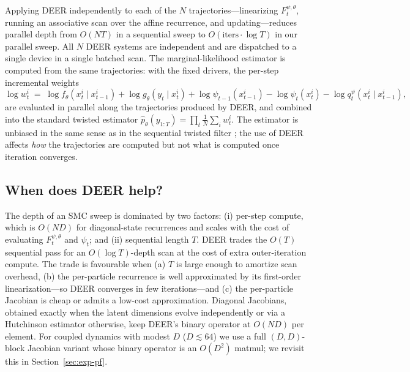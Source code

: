 \documentclass{article}
\begin{document}
Applying DEER independently to each of the $N$ trajectories---linearizing $F_t^{\psi,\theta}$, running an associative scan over the affine recurrence, and updating---reduces parallel depth from $O(NT)$ in a sequential sweep to $O(\text{iters} \cdot \log T)$ in our parallel sweep. All $N$ DEER systems are independent and are dispatched to a single device in a single batched scan. The marginal-likelihood estimator is computed from the same trajectories: with the fixed drivers, the per-step incremental weights
\begin{equation}
    \log w_t^{i} \;=\; \log f_\theta(x_t^{i} \mid x_{t-1}^{i}) + \log g_\theta(y_t \mid x_t^{i}) + \log \psi_{t-1}(x_{t-1}^{i}) - \log \psi_t(x_t^{i}) - \log q_t^\psi(x_t^{i} \mid x_{t-1}^{i}),
    \label{eq:tw-weights}
\end{equation}
are evaluated in parallel along the trajectories produced by DEER, and combined into the standard twisted estimator $\hat{p}_\theta(y_{1:T}) = \prod_t \frac{1}{N}\sum_i w_t^{i}$. The estimator is unbiased in the same sense as in the sequential twisted filter \citep{whiteley2014twisted}; the use of DEER affects \emph{how} the trajectories are computed but not what is computed once iteration converges.

\subsection{When does DEER help?}
\label{sec:deer-tradeoffs}
The depth of an SMC sweep is dominated by two factors: (i) per-step compute, which is $O(ND)$ for diagonal-state recurrences and scales with the cost of evaluating $F_t^{\psi,\theta}$ and $\psi_t$; and (ii) sequential length $T$. DEER trades the $O(T)$ sequential pass for an $O(\log T)$-depth scan at the cost of extra outer-iteration compute. The trade is favourable when (a) $T$ is large enough to amortize scan overhead, (b) the per-particle recurrence is well approximated by its first-order linearization---so DEER converges in few iterations---and (c) the per-particle Jacobian is cheap or admits a low-cost approximation. Diagonal Jacobians, obtained exactly when the latent dimensions evolve independently or via a Hutchinson estimator otherwise, keep DEER's binary operator at $O(ND)$ per element. For coupled dynamics with modest $D$ ($D\!\lesssim\!64$) we use a full $(D,D)$-block Jacobian variant whose binary operator is an $O(D^2)$ matmul; we revisit this in Section~\ref{sec:exp-pf}.
\end{document}
